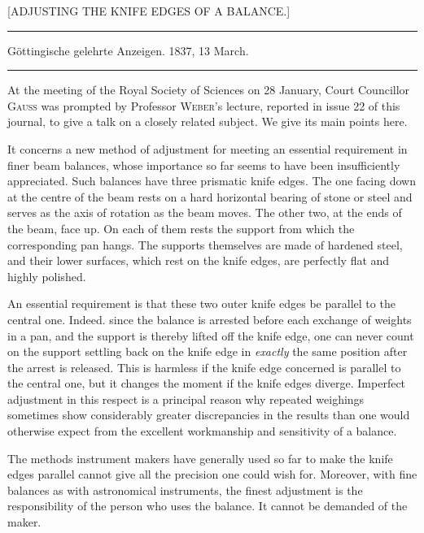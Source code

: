\begin{center}
{\Large [ADJUSTING THE KNIFE EDGES OF A BALANCE.]\par}
\vspace{7mm}\hrule\vspace{2mm}
Göttingische gelehrte Anzeigen. 1837, 13 March.
\vspace{2mm}\hrule\vspace{5mm}
\end{center}
At the meeting of the Royal Society of Sciences on 28 January, Court Councillor \textsc{Gauss} was prompted by Professor \textsc{Weber}'s lecture, reported in issue 22 of this journal, to give a talk on a closely related subject. We give its main points here.

It concerns a new method of adjustment for meeting an essen\-tial requirement in finer beam balances, whose importance so far seems to have been insufficiently appreciated. Such balances have three prismatic knife edges. The one facing down at the centre of the beam rests on a hard horizontal bearing of stone or steel and serves as the axis of rotation as the beam moves. The other two, at the ends of the beam, face up. On each of them rests the support from which the corresponding pan hangs. The supports themselves are made of hardened steel, and their lower surfaces, which rest on the knife edges, are perfectly flat and highly polished.

An essential requirement is that these two outer knife edges be parallel to the central one. Indeed. since the balance is arrested before each exchange of weights in a pan, and the support is thereby lifted off the knife edge, one can never count on the support settling back on the knife edge in \textit{exactly} the same position after the arrest is released. This is harmless if the knife edge concerned is parallel to the central one, but it changes the moment if the knife edges diverge. Imperfect adjustment in this respect is a principal reason why repeated weighings sometimes show considerably greater discrepancies in the results than one
would otherwise expect from the excellent workmanship and sensitivity of a balance.

The methods instrument makers have generally used so far to make the knife edges parallel cannot give all the precision one could wish for. Moreover, with fine balances as with astronomical instruments, the finest adjustment is the responsibility of the person who uses the balance. It cannot be demanded of the maker.

